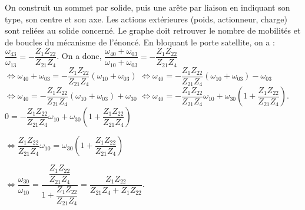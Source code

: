 \begin{corrigebox}
On construit un sommet par solide, puis une arête par liaison en
        indiquant son type, son centre et son axe. Les actions extérieures (poids,
        actionneur, charge) sont reliées au solide concerné. Le graphe doit retrouver le
        nombre de mobilités et de boucles du mécanisme de l'énoncé.
En bloquant le porte satellite, on a : $\dfrac{\omega_{43}}{\omega_{13}}=-\dfrac{Z_{1}Z_{22}}{Z_{21}Z_{4}}$.
  On a donc, 
  $\dfrac{\omega_{40}+\omega_{03}}{\omega_{10}+\omega_{03}}=-\dfrac{Z_{1}Z_{22}}{Z_{21}Z_{4}}$
  $\Leftrightarrow \omega_{40}+\omega_{03}=-\dfrac{Z_{1}Z_{22}}{Z_{21}Z_{4}}\left( \omega_{10}+\omega_{03} \right)$
  $\Leftrightarrow \omega_{40}=-\dfrac{Z_{1}Z_{22}}{Z_{21}Z_{4}}\left( \omega_{10}+\omega_{03} \right)-\omega_{03}$
    $\Leftrightarrow \omega_{40}=-\dfrac{Z_{1}Z_{22}}{Z_{21}Z_{4}}\left( \omega_{10}+\omega_{03} \right)+\omega_{30}$
      $\Leftrightarrow \omega_{40}=-\dfrac{Z_{1}Z_{22}}{Z_{21}Z_{4}}\omega_{10}+\omega_{30}\left( 1+\dfrac{Z_{1}Z_{22}}{Z_{21}Z_{4}} \right)$.
$0=-\dfrac{Z_{1}Z_{22}}{Z_{21}Z_{4}}\omega_{10}+\omega_{30}\left( 1+\dfrac{Z_{1}Z_{22}}{Z_{21}Z_{4}} \right)$

$\Leftrightarrow \dfrac{Z_{1}Z_{22}}{Z_{21}Z_{4}}\omega_{10}=\omega_{30}\left( 1+\dfrac{Z_{1}Z_{22}}{Z_{21}Z_{4}} \right)$

$\Leftrightarrow \dfrac{\omega_{30}}{\omega_{10}} 
= \dfrac{\dfrac{Z_{1}Z_{22}}{Z_{21}Z_{4}}}{ 1+\dfrac{Z_{1}Z_{22}}{Z_{21}Z_{4}} }
= \dfrac{Z_{1}Z_{22}}{ Z_{21}Z_{4}+Z_{1}Z_{22} }$.
\end{corrigebox}
